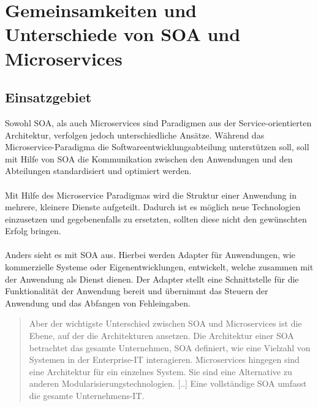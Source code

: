 \chapter[Gemeinsamkeiten und Unterschiede]{Gemeinsamkeiten und Unterschiede von SOA und Microservices}
\label{chap:Unterschiede}

\section{Einsatzgebiet}
\label{sec:Einsatzgebiet}
Sowohl SOA, als auch Microservices sind Paradigmen aus der Service-orientierten Architektur, verfolgen jedoch unterschiedliche Ansätze. Während das Microservice-Paradigma die Softwareentwicklungsabteilung unterstützen soll, soll mit Hilfe von SOA die Kommunikation zwischen den Anwendungen und den Abteilungen standardisiert und optimiert werden.
\\\\
Mit Hilfe des Microservice Paradigmas wird die Struktur einer Anwendung in mehrere, kleinere Dienste aufgeteilt. Dadurch ist es möglich neue Technologien einzusetzen und gegebenenfalls zu ersetzten, sollten diese nicht den gewünschten Erfolg bringen.
\\\\
Anders sieht es mit SOA aus. Hierbei werden Adapter für Anwendungen, wie kommerzielle Systeme oder Eigenentwicklungen, entwickelt, welche zusammen mit der Anwendung als Dienst dienen. Der Adapter stellt eine Schnittstelle für die Funktionalität der Anwendung bereit und übernimmt das Steuern der Anwendung und das Abfangen von Fehleingaben.

\begin{quotation}
	\frqq Aber der wichtigste Unterschied zwischen SOA und Microservices ist die Ebene, auf der die Architekturen ansetzen. Die Architektur einer SOA betrachtet das gesamte Unternehmen, SOA definiert, wie eine Vielzahl von Systemen in der Enterprise-IT interagieren. Microservices hingegen sind eine Architektur für ein einzelnes System. Sie sind eine Alternative zu anderen Modularisierungstechnologien. [..] Eine vollständige SOA umfasst die gesamte Unternehmens-IT.\flqq\ \cite[S. 90]{EWolff2016:Microservices}
\end{quotation}

